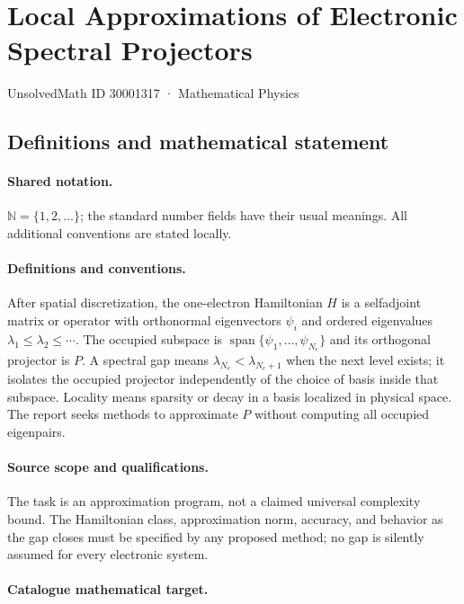 \documentclass[11pt]{article}
\begin{document}
\setcounter{section}{30001316}
\section{Local Approximations of Electronic Spectral Projectors}\label{30001317}
{\small UnsolvedMath ID 30001317 · Mathematical Physics}
\subsection{Definitions and mathematical statement}

\paragraph{Shared notation.}$\mathbb N=\{1,2,\ldots\}$; the standard number fields have their usual meanings. All additional conventions are stated locally.


\paragraph{Definitions and conventions.} After spatial discretization, the one-electron Hamiltonian $H$ is a selfadjoint matrix or operator with orthonormal eigenvectors $\psi_i$ and ordered eigenvalues $\lambda_1\le\lambda_2\le\cdots$. The occupied subspace is $\operatorname{span}\{\psi_1,\ldots,\psi_{N_e}\}$ and its orthogonal projector is $P$. A spectral gap means $\lambda_{N_e}<\lambda_{N_e+1}$ when the next level exists; it isolates the occupied projector independently of the choice of basis inside that subspace. Locality means sparsity or decay in a basis localized in physical space. The report seeks methods to approximate $P$ without computing all occupied eigenpairs.

\paragraph{Source scope and qualifications.} The task is an approximation program, not a claimed universal complexity bound. The Hamiltonian class, approximation norm, accuracy, and behavior as the gap closes must be specified by any proposed method; no gap is silently assumed for every electronic system.

\paragraph{Catalogue mathematical target.}
\end{document}
